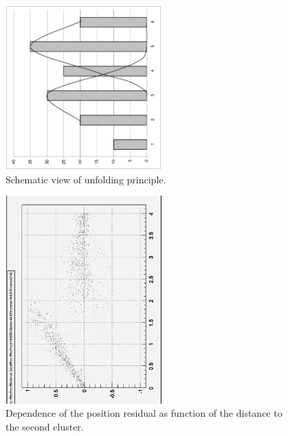 \documentclass[a4paper,12pt]{article}
\begin{document}
\begin{figure}[t]
\centering
\includegraphics[width=60mm,angle=-90]{picCluster/unfolding1.eps}
\caption{
Schematic view of unfolding principle.} \label{figUnfolding1}
\end{figure}
\begin{figure}[t]
\centering
\includegraphics[width=60mm,angle=-90]{picCluster/unfoldingres.eps}
\caption{ Dependence of the position residual as function of the
distance to the second cluster.} \label{figUnfoldingRes}
\end{figure}
\end{document}
